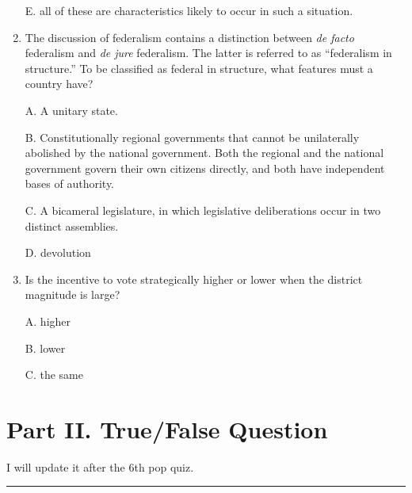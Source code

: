 \documentclass[
]{book}
\begin{document}
\begin{enumerate}
  E. all of these are characteristics likely to occur in such a situation.
\item
  The discussion of federalism contains a distinction between \emph{de facto} federalism and \emph{de jure} federalism. The latter is referred to as ``federalism in structure.'' To be classified as federal in structure, what features must a country have?

  A. A unitary state.

  B. Constitutionally regional governments that cannot be unilaterally abolished by the national government. Both the regional and the national government govern their own citizens directly, and both have independent bases of authority.

  C. A bicameral legislature, in which legislative deliberations occur in two distinct assemblies.

  D. devolution
\item
  Is the incentive to vote strategically higher or lower when the district magnitude is large?

  A. higher

  B. lower

  C. the same
\end{enumerate}

\hypertarget{part-ii.-truefalse-question}{%
\section*{Part II. True/False Question}\label{part-ii.-truefalse-question}}

I will update it after the 6th pop quiz.

\begin{center}\rule{0.5\linewidth}{0.5pt}\end{center}
\end{document}
